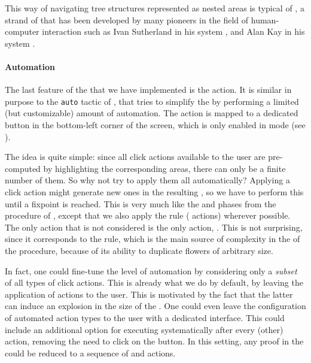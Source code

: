 \begin{scope}
\begin{remark}
\AP This way of navigating tree structures represented as nested areas is typical of
, a strand of  that has been developed by
many pioneers in the field of human-computer interaction such as Ivan Sutherland
in his  system , and Alan Kay
in his  system .
\end{remark}

\paragraph{Automation}

\AP
The last feature of the  that we have implemented is the
  action. It is similar in purpose to the \texttt{auto}
tactic of , that tries to simplify the  by performing a limited
(but customizable) amount of automation. The  action is mapped to a
dedicated button in the bottom-left corner of the screen, which is only enabled
in  mode (see ).

The idea is quite simple: since all click actions available to the user are
pre-computed by highlighting the corresponding areas, there can only be a finite
number of them. So why not try to apply them all automatically? Applying a click
action might generate new ones in the resulting , so we have to perform
this until a fixpoint is reached. This is very much like the  and  phases from the
 procedure of , except that we also apply
the  rule ( actions) wherever possible. The only
 action that is not considered is the only  action,
. This is not surprising, since it corresponds to the 
rule, which is the main source of complexity in the  of
the  procedure, because of its ability to duplicate flowers of
arbitrary size.

In fact, one could fine-tune the level of automation by considering only a
\emph{subset} of all types of click actions. This is already what we do by
default, by leaving the application of  actions to the user. This is
motivated by the fact that the latter can induce an explosion in the size of the
. One could even leave the configuration of automated action types to
the user with a dedicated interface. This could include an additional option for
executing  systematically after every (other)  action,
removing the need to click on the  button. In this setting, any proof
in the  could be reduced to a sequence of  and
 actions.



\end{scope}
